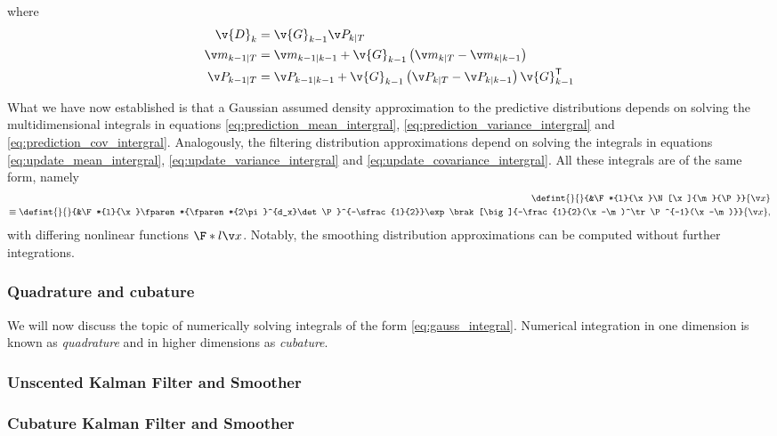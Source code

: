 where
\begin{align}
	\v{D}_{k}&=\v{G}_{k-1}\P_{k|T}\\
	\m_{k-1|T}&=\m_{k-1|k-1}+\v{G}_{k-1}\left(\m_{k|T}-\m_{k|k-1}\right)\\
	\P_{k-1|T}&=\P_{k-1|k-1}+\v{G}_{k-1}\left(\P_{k|T}-\P_{k|k-1}\right)\v{G}_{k-1}^\tr
\end{align}

What we have now established is that a Gaussian assumed density approximation to the
predictive distributions depends on solving the multidimensional integrals in equations
\eqref{eq:prediction_mean_intergral}, \eqref{eq:prediction_variance_intergral} and \eqref{eq:prediction_cov_intergral}.
Analogously, the filtering distribution approximations depend on solving the integrals
in equations \eqref{eq:update_mean_intergral}, \eqref{eq:update_variance_intergral} and
\eqref{eq:update_covariance_intergral}. All these integrals are of the same form,
namely 
\begin{align}
	\defint{}{}{&\F*{l}{\x}\N[\x]{\m}{\P}}{\x}\\
	\equiv\defint{}{}{&\F*{l}{\x}\fparen*{\fparen*{2\pi}^{d_x}\det\P}^{-\sfrac{1}{2}}\exp\brak[\big]{-\frac{1}{2}(\x-\m)^\tr\P^{-1}(\x-\m)}}{\x},
	\label{eq:gauss_integral}
\end{align}
with differing nonlinear functions $\F*{l}{\x}$. Notably, the smoothing distribution approximations can be computed
without further integrations.


\subsubsection{Quadrature and cubature}
 We will now discuss the topic of numerically solving integrals of the form \eqref{eq:gauss_integral}.
 Numerical integration in one dimension is known as \emph{quadrature} and in higher dimensions as \emph{cubature}.


\parencite{Arasaratnam2009,Ito2000}
\subsubsection{Unscented Kalman Filter and Smoother}
\parencite{julier1997new,Merwe2004}
\subsubsection{Cubature Kalman Filter and Smoother}
\parencite{Arasaratnam2009,Arasaratnam2011,Jia2012}



